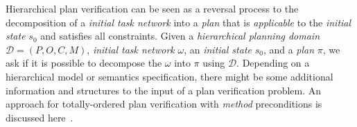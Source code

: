 \medskip\noindent
Hierarchical plan verification can be seen as a reversal process to the decomposition of a \emph{initial task network} into a \emph{plan} that is \emph{applicable} to the \emph{initial state} $s_0$ and satisfies all constraints. Given a \emph{hierarchical planning domain} $\mathcal{D} = (P, O, C, M)$, \emph{initial task network} $\omega$, an \emph{initial state} $s_0$, and a \emph{plan} $\pi$, we ask if it is possible to decompose the $\omega$ into $\pi$ using $\mathcal{D}$. Depending on a hierarchical model or semantics specification, there might be some additional information and structures to the input of a plan verification problem. An approach for totally-ordered plan verification with \emph{method} preconditions is discussed here~\cite{cmyk}.       